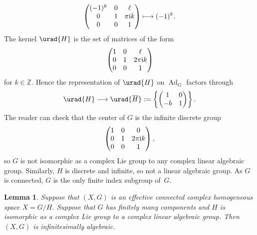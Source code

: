 \documentclass[pdftex]{sigma}
\numberwithin{equation}{section}
\newtheorem{Lemma}[Theorem]{Lemma}
\newcommand{\Z}{\mathbb{Z}}
\DeclareMathOperator{\Ad}{Ad}
\begin{document}
\begin{Example}
\[\begin{pmatrix}
(-1)^k & 0 & \ell \\
0 & 1 & \pi {\rm i} k \\
0 & 0 & 1
\end{pmatrix}
 \longmapsto (-1)^k.
\]
The kernel $\urad{H}$ is the set of matrices of the form
\[
\begin{pmatrix}
1 & 0 & \ell \\
0 & 1 & 2\pi {\rm i} k \\
0 & 0 & 1
\end{pmatrix}
\]
for $k \in \Z$.
Hence the representation of $\urad{H}$ on $\Ad_G$ factors through
\[
\urad{H} \longrightarrow \urad{\overline{H}} := \left\{\begin{pmatrix}1&0\\-b&1\end{pmatrix}\right\}.
\]
The reader can check that the center of $G$ is the infinite discrete group
\[
\begin{pmatrix}
1 & 0 & 0 \\
0 & 1 & 2\pi {\rm i} k \\
0 & 0 & 1
\end{pmatrix},
\]
so $G$ is not isomorphic as a complex Lie group to any complex linear algebraic group.
Similarly, $H$ is discrete and infinite, so not a linear algebraic group.
As $G$ is connected, $G$ is the only finite index subgroup of~$G$.
\end{Example}

\begin{Lemma}
Suppose that $(X, G)$ is an effective connected complex homogeneous space $X=G/H$.
Suppose that $G$ has finitely many components and $H$ is isomorphic as a complex Lie group to a complex linear algebraic group.
Then $(X, G)$ is infinitesimally algebraic.
\end{Lemma}
\end{document}
